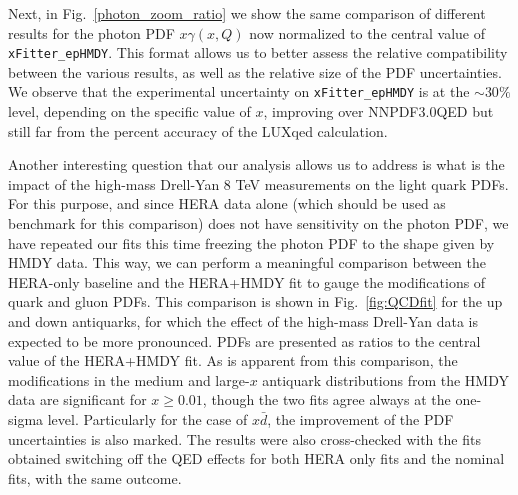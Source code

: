 Next, in Fig.~\ref{photon_zoom_ratio} we show the same comparison of
different results for the photon PDF $x\gamma(x,Q)$ now normalized to
the central value of {\tt xFitter\_epHMDY}.
%
This format allows us to better assess the relative compatibility
between the various results, as well as the relative size of the PDF
uncertainties.
%
We observe that the experimental uncertainty on {\tt xFitter\_epHMDY}
is at the $\sim 30\%$ level, depending on the specific value of $x$,
improving over NNPDF3.0QED but still far from the percent accuracy of
the LUXqed calculation.

Another interesting question that our analysis allows us to address is
what is the impact of the high-mass Drell-Yan 8 TeV measurements on
the light quark PDFs.
%
For this purpose, and since HERA data alone (which should be used as
benchmark for this comparison) does not have sensitivity on the photon
PDF, we have repeated our fits this time freezing the photon PDF to the
shape given by HMDY data.
%
This way, we can perform a meaningful comparison between the HERA-only
baseline and the HERA+HMDY fit to gauge the modifications of quark and
gluon PDFs.
%
This comparison is shown in Fig.~\ref{fig:QCDfit} for the up and down
antiquarks, for which the effect of the high-mass Drell-Yan data is
expected to be more pronounced. PDFs are presented as ratios to the
central value of the HERA+HMDY fit.
%
As is apparent from this comparison, the modifications in the medium
and large-$x$ antiquark distributions from the HMDY data are
significant for $x\ge 0.01$, though the two fits agree always at the
one-sigma level.
%
Particularly for the case of $x\bar{d}$, the improvement of the PDF
uncertainties is also marked.
%
The results were also cross-checked with the fits obtained switching
off the QED effects for both HERA only fits and the nominal fits, with
the same outcome.

